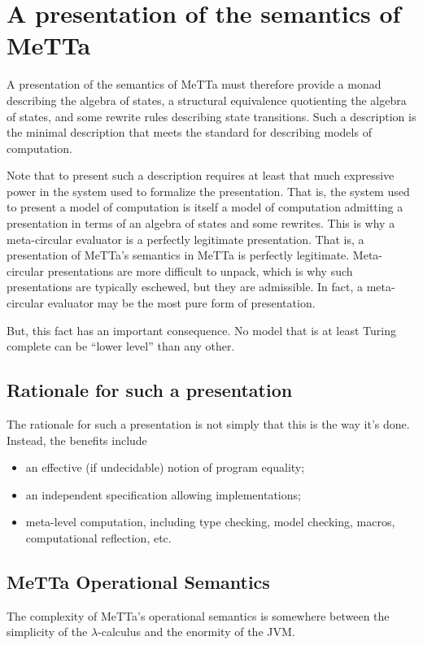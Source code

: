 \section{A presentation of the semantics of MeTTa}

A presentation of the semantics of MeTTa must therefore provide a monad describing the algebra of states, a structural equivalence quotienting the algebra of states, and some rewrite rules describing state transitions. Such a description is the minimal description that meets the standard for describing models of computation. 


Note that to present such a description requires at least that much expressive power in the system used to formalize the presentation. That is, the system used to present a model of computation is itself a model of computation admitting a presentation in terms of an algebra of states and some rewrites. This is why a meta-circular evaluator is a perfectly legitimate presentation. That is, a presentation of MeTTa’s semantics in MeTTa is perfectly legitimate. Meta-circular presentations are more difficult to unpack, which is why such presentations are typically eschewed, but they are admissible. In fact, a meta-circular evaluator may be the most pure form of presentation.


But, this fact has an important consequence. No model that is at least Turing complete can be “lower level” than any other.

\subsection{Rationale for such a presentation}

The rationale for such a presentation is not simply that this is the way it’s done. Instead, the benefits include

\begin{itemize}
  \item an effective (if undecidable) notion of program equality;
  \item an independent specification allowing implementations;
  \item meta-level computation, including type checking, model checking, macros, computational reflection, etc.
\end{itemize}

\subsection{MeTTa Operational Semantics}
The complexity of MeTTa's operational semantics is somewhere between the simplicity of the $\lambda$-calculus and the enormity of the JVM.

